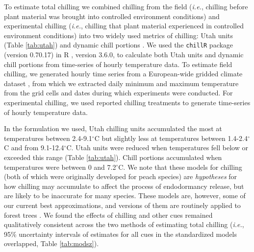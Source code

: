 \documentclass{article}
\begin{document}
\par To estimate total chilling we combined chilling from the field (\emph{i.e.}, chilling before plant material was brought into controlled environment conditions) and experimental chilling (\emph{i.e.}, chilling that plant material experienced in controlled environment conditions) into two widely used metrics of chilling: Utah units (Table \ref{tab:utah}) and dynamic chill portions \emph{\citep{dennis2003,Luedeling:2011qe}}. We used the \texttt{chillR} package (version 0.70.17) in R \emph{\citep{Rcore:2017, chillR2019}}, version 3.6.0, to calculate both Utah units and dynamic chill portions from time-series of hourly temperature data. To estimate field chilling, we generated hourly time series from a European-wide gridded climate dataset \emph{\citep{cornes2018}}, from which we extracted daily minimum and maximum temperature from the grid cells and dates during which experiments were conducted. For experimental chilling, we used reported chilling treatments to generate time-series of hourly temperature data.
\par In the formulation we used, Utah chilling units accumulated the most at temperatures between 2.4-9.1$^{\circ}$C but slightly less at temperatures between 1.4-2.4$^{\circ}$C and from 9.1-12.4$^{\circ}$C. Utah units were reduced when temperatures fell below or exceeded this range (Table \ref{tab:utah}). Chill portions accumulated when temperatures were between 0 and 7.2$^{\circ}$C. We note that these models for chilling (both of which were originally developed for peach species) are \emph{hypotheses} for how chilling may accumulate to affect the process of endodormancy release, but are likely to be inaccurate for many species. These models are, however, some of our current best approximations, and versions of them are routinely applied to forest trees \emph{\citep[e.g.,][]{Harrington:2010}}. We found the effects of chilling and other cues remained qualitatively consistent across the two methods of estimating total chilling (\emph{i.e.}, 95\% uncertainty intervals of estimates for all cues in the standardized models overlapped, Table \ref{tab:modsz}).
\end{document}
